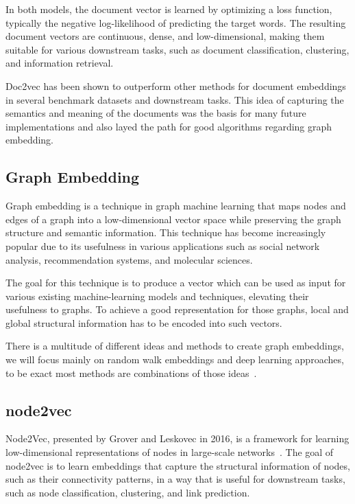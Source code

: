 In both models, the document vector is learned by optimizing a loss function, typically the negative log-likelihood of predicting the target words. The resulting document vectors are continuous, dense, and low-dimensional, making them suitable for various downstream tasks, such as document classification, clustering, and information retrieval.

Doc2vec has been shown to outperform other methods for document embeddings in several benchmark datasets and downstream tasks. This idea of capturing the semantics and meaning of the documents was the basis for many future implementations and also layed the path for good algorithms regarding graph embedding.

\subsection{Graph Embedding}
Graph embedding is a technique in graph machine learning that maps nodes and edges of a graph into a low-dimensional vector space while preserving the graph structure and semantic information. This technique has become increasingly popular due to its usefulness in various applications such as social network analysis, recommendation systems, and molecular sciences.

The goal for this technique is to produce a vector which can be used as input for various existing machine-learning models and techniques, elevating their usefulness to graphs. To achieve a good representation for those graphs, local and global structural information has to be encoded into such vectors.

There is a multitude of different ideas and methods to create graph embeddings, we will focus mainly on random walk embeddings and deep learning approaches, to be exact most methods are combinations of those ideas~\cite{2017graph2vec,2016node2vec,2021graphormer}.

\subsection{node2vec}

Node2Vec, presented by Grover and Leskovec in 2016, is a framework for learning low-dimensional representations of nodes in large-scale networks~\cite{2016node2vec}. The goal of node2vec is to learn embeddings that capture the structural information of nodes, such as their connectivity patterns, in a way that is useful for downstream tasks, such as node classification, clustering, and link prediction.

